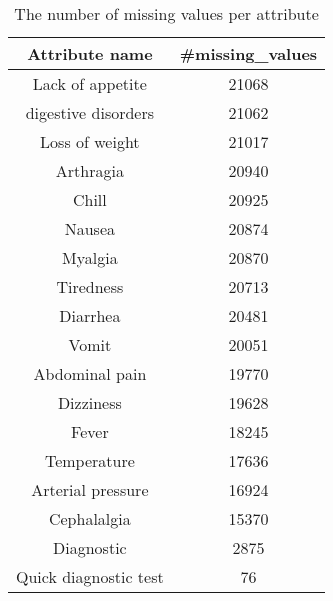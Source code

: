 \begin{table}[!ht]
\centering
\begin{tabular}{cc}
\textbf{Attribute name} & \textbf{\#missing\_values}\\
\toprule
Lack of appetite &    21068 \\
digestive disorders & 21062 \\
Loss of weight &   21017 \\
Arthragia &     20940\\
Chill &      20925\\
Nausea &     20874\\
Myalgia &    20870\\
Tiredness&   20713 \\
Diarrhea &     20481\\
Vomit &        20051 \\
Abdominal pain &  19770 \\
Dizziness &       19628 \\
Fever &        18245 \\
Temperature &     17636 \\
Arterial pressure &    16924 \\
Cephalalgia &       15370 \\
Diagnostic  &     2875 \\
Quick diagnostic test &  76 \\
\bottomrule
\end{tabular}
\vspace*{.5cm}
\caption{The number of missing values per attribute}\label{table-missing}
\end{table} 
